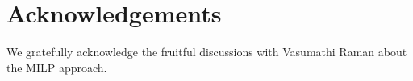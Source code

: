 \section*{Acknowledgements}
We gratefully acknowledge the fruitful discussions with Vasumathi Raman about the MILP approach.